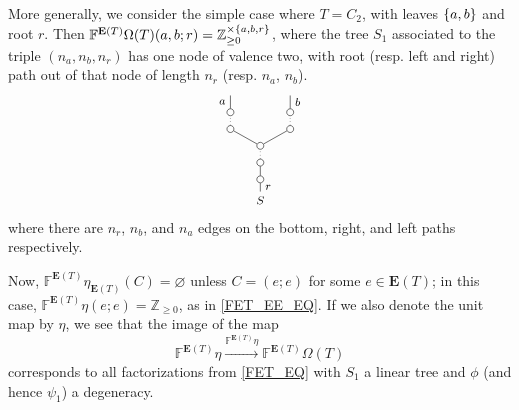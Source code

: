 \documentclass[a4paper,10pt
,draft
]{article}%
\renewcommand{\1}{\eta}%
\begin{document}
\begin{example}
      More generally, we consider the simple case where $T = C_2$, with leaves $\left\{a,b\right\}$ and root $r$.
      Then $\mathbb F^{\mathbf E(T)}\Omega(T)(a,b;r) = \mathbb Z_{\geq 0}^{\times \left\{a,b,r\right\}}$,
      where the tree $S_1$ associated to the triple $(n_a, n_b, n_r)$ has one node of valence two,
      with root (resp. left and right) path out of that node of length $n_r$ (resp. $n_a$, $n_b$).
      \[
            \begin{tikzpicture}
                  [grow=up,auto,
                  level distance=2em,
                  every node/.style = {font=\footnotesize,solid},
                  dummy/.style={circle,draw,inner sep=0pt,minimum size=1.75mm},
                  emph/.style={edge from parent/.style={black,thin,dotted,draw}},
                  norm/.style={edge from parent/.style={black,thin,draw,solid}}
                  ]
                  \node {$S$}
                  child[norm, level distance=1.5em] {node [dummy] {}
                    child[norm, level distance=1.2em] {node [dummy] {}
                      child[emph]{node [dummy] {} %
                        child[norm] {node [dummy] {}
                          child[emph] {node [dummy] {}
                            child[norm] {edge from parent node [swap] {$b$}}
                          }
                        }
                         child[norm] {node [dummy] {}
                          child[emph] {node [dummy] {}
                            child[norm] {edge from parent node {$a$}}
                          }
                        }
                      }
                    }
                    edge from parent node [swap] {$r$}
                  };
            \end{tikzpicture}
      \]
      where there are $n_r$, $n_b$, and $n_a$ edges on the bottom, right, and left paths respectively.
\end{example}
      
Now, $\mathbb F^{\mathbf E(T)}\eta_{\mathbf E(T)}(C) = \varnothing$ unless $C = (e;e)$ for some $e \in \mathbf E(T)$;
in this case, $\mathbb F^{\mathbf E(T)}\eta(e;e) = \mathbb Z_{\geq 0}$, as in \eqref{FET_EE_EQ}.
% 
If we also denote the unit map by $\eta$, we see that the image of the map
\[
      \mathbb F^{\mathbf E(T)}\eta \xrightarrow{\mathbb F^{\mathbf E(T)}\eta} \mathbb F^{\mathbf E(T)} \Omega(T)
\]
corresponds to all factorizations from \eqref{FET_EQ} with $S_1$ a linear tree and $\phi$ (and hence $\psi_1$) a degeneracy.
\end{document}
